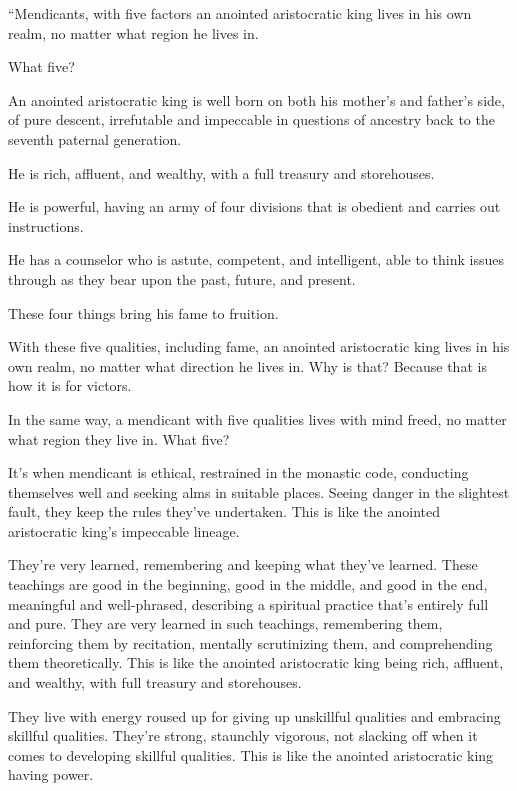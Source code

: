 \documentclass[12pt,openany]{book}%
\begin{document}
“Mendicants, with five factors an anointed aristocratic king lives in his own realm, no matter what region he lives in. 

What five? 

An anointed aristocratic king is well born on both his mother’s and father’s side, of pure descent, irrefutable and impeccable in questions of ancestry back to the seventh paternal generation. 

He is rich, affluent, and wealthy, with a full treasury and storehouses. 

He is powerful, having an army of four divisions that is obedient and carries out instructions. 

He has a counselor who is astute, competent, and intelligent, able to think issues through as they bear upon the past, future, and present. 

These four things bring his fame to fruition. 

With these five qualities, including fame, an anointed aristocratic king lives in his own realm, no matter what direction he lives in. Why is that? Because that is how it is for victors. 

In the same way, a mendicant with five qualities lives with mind freed, no matter what region they live in. What five? 

It’s when mendicant is ethical, restrained in the monastic code, conducting themselves well and seeking alms in suitable places. Seeing danger in the slightest fault, they keep the rules they’ve undertaken. This is like the anointed aristocratic king’s impeccable lineage. 

They’re very learned, remembering and keeping what they’ve learned. These teachings are good in the beginning, good in the middle, and good in the end, meaningful and well-phrased, describing a spiritual practice that’s entirely full and pure. They are very learned in such teachings, remembering them, reinforcing them by recitation, mentally scrutinizing them, and comprehending them theoretically. This is like the anointed aristocratic king being rich, affluent, and wealthy, with full treasury and storehouses. 

They live with energy roused up for giving up unskillful qualities and embracing skillful qualities. They’re strong, staunchly vigorous, not slacking off when it comes to developing skillful qualities. This is like the anointed aristocratic king having power. 
\end{document}
